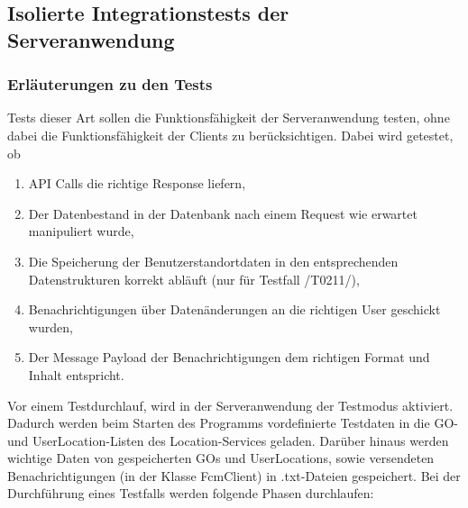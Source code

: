 \documentclass[11pt,a4paper]{scrartcl}
\begin{document}
\subsection{Isolierte Integrationstests der Serveranwendung}\label{ServerIT}
\subsubsection{Erläuterungen zu den Tests}
Tests dieser Art sollen die Funktionsfähigkeit der Serveranwendung testen, ohne dabei die Funktionsfähigkeit der Clients zu berücksichtigen. Dabei wird getestet, ob
\begin{enumerate}
	\item API Calls die richtige Response liefern,
	\item Der Datenbestand in der Datenbank nach einem Request wie erwartet manipuliert wurde,
	\item Die Speicherung der Benutzerstandortdaten in den entsprechenden Datenstrukturen korrekt abläuft (nur für Testfall /T0211/),
	\item Benachrichtigungen über Datenänderungen an die richtigen User geschickt wurden,
	\item Der Message Payload der Benachrichtigungen dem richtigen Format und Inhalt entspricht.
\end{enumerate}

Vor einem Testdurchlauf, wird in der Serveranwendung der Testmodus aktiviert. Dadurch werden beim Starten des Programms vordefinierte Testdaten in die GO- und UserLocation-Listen des Location-Services geladen. Darüber hinaus werden wichtige Daten von gespeicherten GOs und UserLocations, sowie versendeten Benachrichtigungen (in der Klasse FcmClient) in .txt-Dateien gespeichert.
Bei der Durchführung eines Testfalls werden folgende Phasen durchlaufen:
\end{document}
